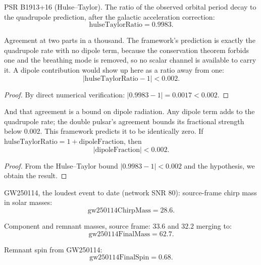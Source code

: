 \begin{definition}
PSR B1913+16 (Hulse–Taylor). The ratio of the observed orbital period decay to the quadrupole prediction, after the galactic acceleration correction:
\[
\text{hulseTaylorRatio} = 0.9983.
\]
\end{definition}

\begin{theorem}
Agreement at two parts in a thousand. The framework's prediction is exactly the quadrupole rate with no dipole term, because the conservation theorem forbids one and the breathing mode is removed, so no scalar channel is available to carry it. A dipole contribution would show up here as a ratio away from one:
\[
|\text{hulseTaylorRatio} - 1| < 0.002.
\]
\begin{proof}
By direct numerical verification: $|0.9983 - 1| = 0.0017 < 0.002$.
\end{proof}
\end{theorem}

\begin{theorem}
And that agreement is a bound on dipole radiation. Any dipole term adds to the quadrupole rate; the double pulsar's agreement bounds its fractional strength below $0.002$. This framework predicts it to be identically zero. If $\text{hulseTaylorRatio} = 1 + \text{dipoleFraction}$, then
\[
|\text{dipoleFraction}| < 0.002.
\]
\begin{proof}
From the Hulse–Taylor bound $|0.9983 - 1| < 0.002$ and the hypothesis, we obtain the result.
\end{proof}
\end{theorem}

\begin{definition}
GW250114, the loudest event to date (network SNR $80$): source-frame chirp mass in solar masses:
\[
\text{gw250114ChirpMass} = 28.6.
\]
\end{definition}

\begin{definition}
Component and remnant masses, source frame: $33.6$ and $32.2$ merging to:
\[
\text{gw250114FinalMass} = 62.7.
\]
\end{definition}

\begin{definition}
Remnant spin from GW250114:
\[
\text{gw250114FinalSpin} = 0.68.
\]
\end{definition}

